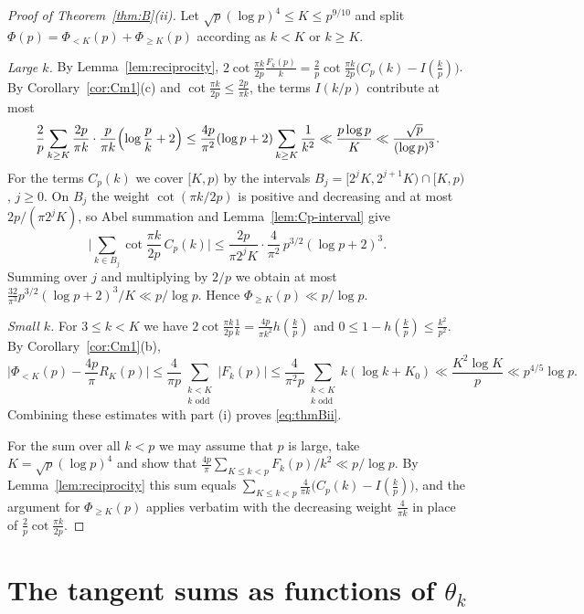 \begin{proof}[Proof of Theorem~\ref{thm:B}\textup{(ii)}]
Let $\sqrt p(\log p)^4\le K\le p^{9/10}$ and split $\Phi(p)=\Phi_{<K}(p)+\Phi_{\ge K}(p)$ according as $k<K$ or
$k\ge K$.

\emph{Large $k$.} By Lemma~\ref{lem:reciprocity}, $2\cot\frac{\pi k}{2p}\frac{F_k(p)}{k}=\frac2p\cot\frac{\pi k}{2p}\bigl(C_p(k)-I(\frac
kp)\bigr)$. By Corollary~\ref{cor:Cm1}(c) and $\cot\frac{\pi k}{2p}\le\frac{2p}{\pi k}$, the terms $I(k/p)$ contribute at most
\[
\frac2p\sum_{k\ge K}\frac{2p}{\pi k}\cdot\frac{p}{\pi k}\Bigl(\log\frac pk+2\Bigr)\le\frac{4p}{\pi^2}(\log p+2)
\sum_{k\ge K}\frac1{k^2}\ll\frac{p\log p}{K}\ll\frac{\sqrt p}{(\log p)^3}.
\]
For the terms $C_p(k)$ we cover $[K,p)$ by the intervals $B_j=[2^jK,2^{j+1}K)\cap[K,p)$, $j\ge0$. On $B_j$ the weight
$\cot(\pi k/2p)$ is positive and decreasing and at most $2p/(\pi2^jK)$, so Abel summation and
Lemma~\ref{lem:Cp-interval} give
\[
\Big|\sum_{k\in B_j}\cot\frac{\pi k}{2p}\,C_p(k)\Big|\le\frac{2p}{\pi2^jK}\cdot\frac4{\pi^2}\,p^{3/2}(\log p+2)^3.
\]
Summing over $j$ and multiplying by $2/p$ we obtain at most $\frac{32}{\pi^3}p^{3/2}(\log p+2)^3/K\ll p/\log p$. Hence
$\Phi_{\ge K}(p)\ll p/\log p$.

\emph{Small $k$.} For $3\le k<K$ we have $2\cot\frac{\pi k}{2p}\frac1k=\frac{4p}{\pi k^2}h(\frac kp)$ and
$0\le1-h(\frac kp)\le\frac{k^2}{p^2}$. By Corollary~\ref{cor:Cm1}(b),
\[
\bigg|\Phi_{<K}(p)-\frac{4p}{\pi}R_K(p)\bigg|\le\frac4{\pi p}\sum_{\substack{k<K\\ k\text{ odd}}}|F_k(p)|
\le\frac4{\pi^2p}\sum_{\substack{k<K\\ k\text{ odd}}}k(\log k+K_0)\ll\frac{K^2\log K}{p}\ll p^{4/5}\log p.
\]
Combining these estimates with part (i) proves \eqref{eq:thmBii}.

For the sum over all $k<p$ we may assume that $p$ is large, take $K=\sqrt p(\log p)^4$ and show that
$\frac{4p}{\pi}\sum_{K\le k<p}F_k(p)/k^2\ll p/\log p$. By Lemma~\ref{lem:reciprocity} this sum equals
$\sum_{K\le k<p}\frac4{\pi k}\bigl(C_p(k)-I(\frac kp)\bigr)$, and the argument for $\Phi_{\ge K}(p)$ applies verbatim
with the decreasing weight $\frac4{\pi k}$ in place of $\frac2p\cot\frac{\pi k}{2p}$.
\end{proof}

\section{The tangent sums as functions of \texorpdfstring{$\theta_k$}{theta\_k}}\label{sec:tangent}


